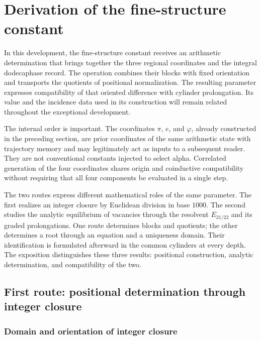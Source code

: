 \section{Derivation of the fine-structure constant}
\label{sec:alpha}

In this development, the fine-structure constant receives an arithmetic
determination that brings together the three regional coordinates and the integral
dodecaphase record. The operation combines their blocks with fixed orientation and
transports the quotients of positional normalization. The resulting
parameter expresses compatibility of that oriented difference with
cylinder prolongation. Its value and the incidence data
used in its construction will remain related throughout the
exceptional development.

The internal order is important. The coordinates \(\pi\),
\(e\), and \(\varphi\), already constructed in the preceding section, are prior
coordinates of the same arithmetic state with trajectory memory and may legitimately act as
inputs to a subsequent reader. They are not conventional constants
injected to select alpha. Correlated generation of the four coordinates shares origin and
coinductive compatibility without requiring that all four
components be evaluated in a single step.

The two routes express different mathematical roles of the same parameter.
The first realizes an integer closure by Euclidean division in base
\(1000\). The second studies the analytic equilibrium of vacancies through
the resolvent \(E_{21/22}\) and its graded prolongations. One route
determines blocks and quotients; the other determines a root through an
equation and a uniqueness domain. Their identification is formulated afterward
in the common cylinders at every depth. The exposition distinguishes
these three results: positional construction, analytic determination,
and compatibility of the two.

\subsection{First route: positional determination through integer closure}
\subsubsection{Domain and orientation of integer closure}
\label{subsec:alpha-dominio}

